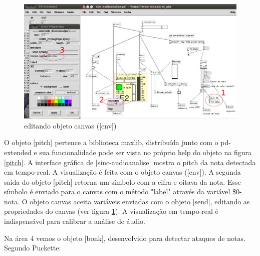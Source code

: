 \documentclass{ppgmus}
\begin{document}
\begin{figure}
\includegraphics[scale=.5]{canvas-edit}
\caption{editando objeto canvas ([cnv])}
\label{canvas-edit}
\end{figure}


O objeto [pitch] pertence a biblioteca maxlib, distribuída junto com o 
pd-extended e sua funcionalidade pode ser vista no próprio help do objeto na 
figura \ref{pitch}. A interface gráfica de [sinc-audioanalise] mostra o pitch
da nota detectada em tempo-real. A visualização é feita com o objeto canvas ([cnv]).
A segunda saída do objeto [pitch] retorna um símbolo com a cifra e oitava
da nota. Esse símbolo é enviado para o canvas com o método "label" através
da variável \$0-nota. O objeto canvas aceita variáveis enviadas com o objeto [send],
editando as propriedades do canvas (ver figura \ref{canvas-edit}). A visualização em tempo-real
é indispensável para calibrar a análise de áudio.




Na área 4 vemos o objeto [bonk\texttildelow], desenvolvido para
detectar ataques de notas. Segundo Puckette:
\end{document}
